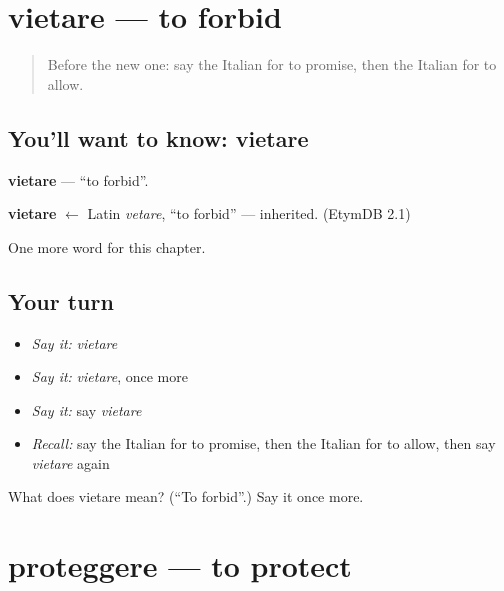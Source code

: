 \section[vietare]{vietare — to forbid}

\label{lesson:IT-C177-vietare}



\begin{quote}
Before the new one: say the Italian for to promise, then the Italian for to allow.
\end{quote}

\subsection*{You'll want to know: vietare}
\textbf{vietare} — \textquotedblleft{}to forbid\textquotedblright{}.

\begin{cousinweb}
\textbf{vietare} $\leftarrow$ Latin \emph{vetare}, \textquotedblleft{}to forbid\textquotedblright{} — inherited. (EtymDB 2.1)
\end{cousinweb}

\begin{grammarlens}[title={What you've built}]
One more word for this chapter.
\end{grammarlens}

\subsection*{Your turn}
\begin{itemize}
\raggedright
  \item \emph{Say it:} \emph{vietare}
  \item \emph{Say it:} \emph{vietare}, once more
  \item \emph{Say it:} say \emph{vietare}
  \item \emph{Recall:} say the Italian for to promise, then the Italian for to allow, then say \emph{vietare} again
\end{itemize}

\begin{tcolorbox}[breakable,colback=teal!4,colframe=teal!35!black,title={Before you move on}]
What does vietare mean? (\textquotedblleft{}To forbid\textquotedblright{}.) Say it once more.
\end{tcolorbox}
\section[proteggere]{proteggere — to protect}

